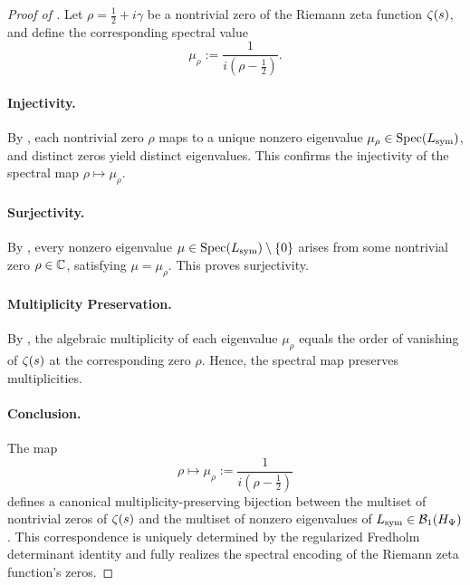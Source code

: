 \begin{proof}[Proof of ]
Let \( \rho = \tfrac{1}{2} + i\gamma \) be a nontrivial zero of the Riemann zeta function \( \zeta(s) \), and define the corresponding spectral value
\[
\mu_\rho := \frac{1}{i(\rho - \tfrac{1}{2})}.
\]

\paragraph{Injectivity.}
By , each nontrivial zero \( \rho \) maps to a unique nonzero eigenvalue \( \mu_\rho \in \operatorname{Spec}(L_{\mathrm{sym}}) \), and distinct zeros yield distinct eigenvalues. This confirms the injectivity of the spectral map \( \rho \mapsto \mu_\rho \).

\paragraph{Surjectivity.}
By , every nonzero eigenvalue \( \mu \in \operatorname{Spec}(L_{\mathrm{sym}}) \setminus \{0\} \) arises from some nontrivial zero \( \rho \in \mathbb{C} \), satisfying \( \mu = \mu_\rho \). This proves surjectivity.

\paragraph{Multiplicity Preservation.}
By , the algebraic multiplicity of each eigenvalue \( \mu_\rho \) equals the order of vanishing of \( \zeta(s) \) at the corresponding zero \( \rho \). Hence, the spectral map preserves multiplicities.

\paragraph{Conclusion.}
The map
\[
\rho \longmapsto \mu_\rho := \frac{1}{i(\rho - \tfrac{1}{2})}
\]
defines a canonical multiplicity-preserving bijection between the multiset of nontrivial zeros of \( \zeta(s) \) and the multiset of nonzero eigenvalues of \( L_{\mathrm{sym}} \in \mathcal{B}_1(H_{\Psi}) \). This correspondence is uniquely determined by the regularized Fredholm determinant identity and fully realizes the spectral encoding of the Riemann zeta function's zeros.
\end{proof}
